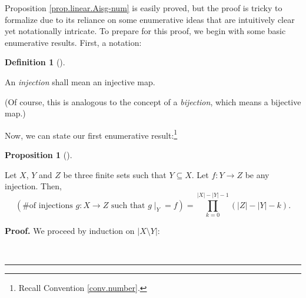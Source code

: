 \documentclass[numbers=enddot,12pt,final,onecolumn,notitlepage]{scrartcl}%
\numberwithin{exer}{section}
\theoremstyle{definition}
\newtheorem{prop}[theo]{Proposition}
\newenvironment{proposition}[1][]
{\begin{prop}[#1]\begin{leftbar}}
{\end{leftbar}\end{prop}}
\newtheorem{defi}[theo]{Definition}
\newenvironment{definition}[1][]
{\begin{defi}[#1]\begin{leftbar}}
{\end{leftbar}\end{defi}}
\newenvironment{proof}[1][Proof]{\noindent\textbf{#1.} }{\ \rule{0.5em}{0.5em}}
\let\prodnonlimits\prod
\renewcommand{\prod}{\prodnonlimits\limits}
\newenvironment{verlong}{}{}
\begin{document}
\begin{verlong}
Proposition \ref{prop.linear.Aisg-num} is easily proved, but the proof is
tricky to formalize due to its reliance on some enumerative ideas that are
intuitively clear yet notationally intricate. To prepare for this proof, we
begin with some basic enumerative results. First, a notation:

\begin{definition}
An \emph{injection} shall mean an injective map.
\end{definition}

(Of course, this is analogous to the concept of a \emph{bijection}, which
means a bijective map.)

Now, we can state our first enumerative result:\footnote{Recall Convention
\ref{conv.number}.}

\begin{proposition}
\label{prop.count.inj-maps.extend}Let $X$, $Y$ and $Z$ be three finite sets
such that $Y\subseteq X$. Let $f:Y\rightarrow Z$ be any injection. Then,%
\[
\left(  \text{\# of injections }g:X\rightarrow Z\text{ such that }\left.
g\mid_{Y}\right.  =f\right)  =\prod_{k=0}^{\left\vert X\right\vert -\left\vert
Y\right\vert -1}\left(  \left\vert Z\right\vert -\left\vert Y\right\vert
-k\right)  .
\]

\end{proposition}

\begin{proof}
We proceed by induction on $\left\vert X\setminus Y\right\vert $:


\end{proof}
\end{verlong}
\end{document}
